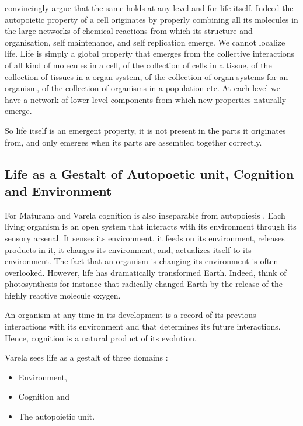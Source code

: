 \documentclass[
  11pt,
]{book}
\providecommand{\tightlist}{%
  \setlength{\itemsep}{0pt}\setlength{\parskip}{0pt}}
\begin{document}
\citet{capraLuisi2014} convincingly argue that the same holds at any level and for life itself. Indeed the autopoietic property of a cell originates by properly combining all its molecules in the large networks of chemical reactions from which its structure and organisation, self maintenance, and self replication emerge. We cannot localize life. Life is simply a global property that emerges from the collective interactions of all kind of molecules in a cell, of the collection of cells in a tissue, of the collection of tissues in a organ system, of the collection of organ systems for an organism, of the collection of organisms in a population etc.
At each level we have a network of lower level components from which new properties naturally emerge.

So life itself is an emergent property, it is not present in the parts it originates from, and only emerges when its parts are assembled together correctly.

\hypertarget{life-as-a-gestalt-of-autopoetic-unit-cognition-and-environment}{%
\subsection{Life as a Gestalt of Autopoetic unit, Cognition and Environment}\label{life-as-a-gestalt-of-autopoetic-unit-cognition-and-environment}}

For Maturana and Varela cognition is also inseparable from autopoiesis \citep{capraLuisi2014}. Each living organism is an open system that interacts with its environment through its sensory arsenal. It senses its environment, it feeds on its environment, releases products in it, it changes its environment, and, actualizes itself to its environment. The fact that an organism is changing its environment is often overlooked. However, life has dramatically transformed Earth. Indeed, think of photosynthesis for instance that radically changed Earth by the release of the highly reactive molecule oxygen.

An organism at any time in its development is a record of its previous interactions with its environment and that determines its future interactions.
Hence, cognition is a natural product of its evolution.

Varela sees life as a gestalt of three domains \citep{capraLuisi2014}:

\begin{itemize}
\tightlist
\item
  Environment,
\item
  Cognition and
\item
  The autopoietic unit.
\end{itemize}
\end{document}
